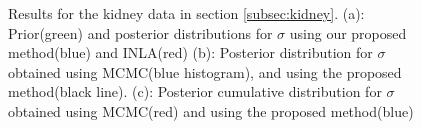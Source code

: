 \documentclass[ba]{imsart}
\begin{document}
\begin{figure}[ht]
\centering
{}
\caption{Results for the kidney data in section \ref{subsec:kidney}. (a): Prior(green) and posterior distributions for $\sigma$ using our proposed method(blue) and INLA(red) (b): Posterior distribution for $\sigma$ obtained using MCMC(blue histogram), and using the proposed method(black line). (c): Posterior cumulative distribution for $\sigma$ obtained using MCMC(red) and using the proposed method(blue)}
\label{fig:kidneyHyper}
\end{figure}
\end{document}
